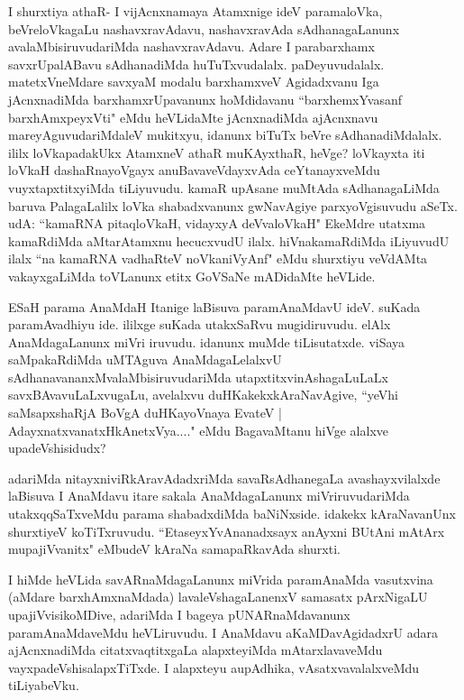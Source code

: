 \begin{artha}
I shurxtiya athaR- I vijAcnxnamaya Atamxnige ideV paramaloVka, beVreloVkagaLu nashavxravAdavu, nashavxravAda sAdhanagaLanunx avalaMbisiruvudariMda nashavxravAdavu. Adare I parabarxhamx savxrUpalABavu sAdhanadiMda huTuTxvudalalx. paDeyuvudalalx. matetxVneMdare savxyaM modalu barxhamxveV Agidadxvanu Iga jAcnxnadiMda barxhamxrUpavanunx hoMdidavanu ``barxhemxYvasanf barxhAmxpeyxVti" eMdu heVLidaMte jAcnxnadiMda ajAcnxnavu mareyAguvudariMdaleV mukitxyu, idanunx biTuTx beVre sAdhanadiMdalalx. ililx loVkapadakUkx AtamxneV athaR muKAyxthaR, heVge? loVkayxta iti loVkaH dashaRnayoVgayx anuBavaveVdayxvAda ceYtanayxveMdu vuyxtapxtitxyiMda tiLiyuvudu. kamaR upAsane muMtAda sAdhanagaLiMda baruva PalagaLalilx loVka shabadxvanunx gwNavAgiye parxyoVgisuvudu aSeTx. udA: ``kamaRNA pitaqloVkaH, vidayxyA deVvaloVkaH" EkeMdre utatxma kamaRdiMda aMtarAtamxnu hecucxvudU ilalx. hiVnakamaRdiMda iLiyuvudU ilalx ``na kamaRNA vadhaRteV noVkaniVyAnf" eMdu shurxtiyu veVdAMta vakayxgaLiMda toVLanunx etitx GoVSaNe mADidaMte heVLide. 
\end{artha}%

\begin{artha}
ESaH parama AnaMdaH Itanige laBisuva paramAnaMdavU ideV. suKada paramAvadhiyu ide. ililxge suKada utakxSaRvu mugidiruvudu. elAlx AnaMdagaLanunx miVri iruvudu. idanunx muMde tiLisutatxde. viSaya saMpakaRdiMda uMTAguva AnaMdagaLelalxvU sAdhanavananxMvalaMbisiruvudariMda utapxtitxvinAshagaLuLaLx savxBAvavuLaLxvugaLu, avelalxvu duHKakekxkAraNavAgive, ``yeVhi saMsapxshaRjA BoVgA duHKayoVnaya EvateV | AdayxnatxvanatxHkAnetxVya...." eMdu BagavaMtanu hiVge alalxve upadeVshisidudx? 
\end{artha}

\begin{artha}
adariMda nitayxniviRkAravAdadxriMda savaRsAdhanegaLa avashayxvilalxde laBisuva I AnaMdavu itare sakala AnaMdagaLanunx miVriruvudariMda utakxqqSaTxveMdu parama shabadxdiMda baNiNxside. idakekx kAraNavanUnx shurxtiyeV koTiTxruvudu. ``EtaseyxYvAnanadxsayx anAyxni BUtAni mAtArx mupajiVvanitx" eMbudeV kAraNa samapaRkavAda shurxti.
\end{artha}


\begin{artha}
I hiMde heVLida savARnaMdagaLanunx miVrida paramAnaMda vasutxvina (aMdare barxhAmxnaMdada) lavaleVshagaLanenxV samasatx pArxNigaLU upajiVvisikoMDive, adariMda I bageya pUNARnaMdavanunx paramAnaMdaveMdu heVLiruvudu. I AnaMdavu aKaMDavAgidadxrU adara ajAcnxnadiMda citatxvaqtitxgaLa alapxteyiMda mAtarxlavaveMdu vayxpadeVshisalapxTiTxde. I alapxteyu aupAdhika, vAsatxvavalalxveMdu tiLiyabeVku.   
\end{artha}

